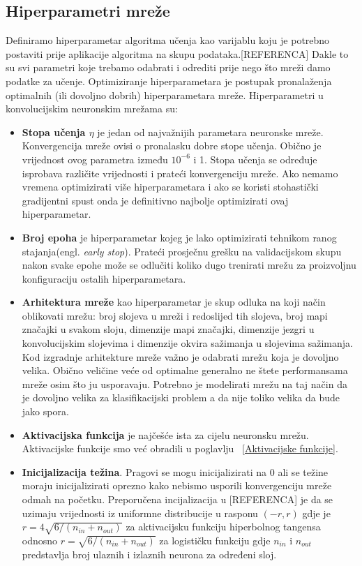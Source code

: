 \documentclass[times, utf8, zavrsni, numeric]{fer}
\begin{document}
\subsection{Hiperparametri mreže}
Definiramo hiperparametar algoritma učenja kao varijablu koju je potrebno postaviti prije aplikacije algoritma na skupu podataka.[REFERENCA] Dakle to su svi parametri koje trebamo odabrati i odrediti prije nego što mreži damo podatke za učenje. Optimiziranje hiperparametara je postupak pronalaženja optimalnih (ili dovoljno dobrih) hiperparametara mreže. Hiperparametri u konvolucijskim neuronskim mrežama su:
\begin{itemize}
\renewcommand\labelitemi{$\bullet$}
\item \textbf{Stopa učenja $\eta$} je jedan od najvažnijih parametara neuronske mreže. Konvergencija mreže ovisi o pronalasku dobre stope učenja. Obično je vrijednost ovog parametra između $10^{-6}$ i 1. Stopa učenja se određuje isprobava različite vrijednosti i prateći konvergenciju mreže. Ako nemamo vremena optimizirati više hiperparametara i ako se koristi stohastički gradijentni spust onda je definitivno najbolje optimizirati ovaj hiperparametar.

\item \textbf{Broj epoha} je hiperparametar kojeg je lako optimizirati tehnikom ranog stajanja(engl. \textit{early stop}). Prateći prosječnu grešku na validacijskom skupu nakon svake epohe može se odlučiti koliko dugo trenirati mrežu za proizvoljnu konfiguraciju ostalih hiperparametara.

\item \textbf{Arhitektura mreže} kao hiperparametar je skup odluka na koji način oblikovati mrežu: broj slojeva u mreži i redoslijed tih slojeva, broj mapi značajki u svakom sloju, dimenzije mapi značajki,
dimenzije jezgri u konvolucijskim slojevima i dimenzije okvira sažimanja u slojevima sažimanja. Kod izgradnje arhitekture mreže važno je odabrati mrežu koja je dovoljno velika. Obično veličine veće od optimalne generalno ne štete performansama mreže osim što ju usporavaju. Potrebno je modelirati mrežu na taj način da je dovoljno velika za klasifikacijski problem a da nije toliko velika da bude jako spora.

\item \textbf{Aktivacijska funkcija} je najčešće ista za cijelu neuronsku mrežu. Aktivacijske funkcije smo već obradili u poglavlju ~\ref{Aktivacijske funkcije}. 

\item \textbf{Inicijalizacija težina}. Pragovi se mogu inicijalizirati na 0 ali se težine moraju inicijalizirati oprezno kako nebismo usporili konvergenciju mreže odmah na početku. Preporučena incijalizacija u [REFERENCA] je da se uzimaju vrijednosti iz uniformne distribucije u rasponu $(-r, r)$ gdje je $r = 4\sqrt{6/(n_{in} + n_{out})}$ za aktivacijsku funkciju hiperbolnog tangensa odnosno $r = \sqrt{6/(n_{in} + n_{out})}$ za logističku funkciju gdje $n_{in}$ i $n_{out}$ predstavlja broj ulaznih i izlaznih neurona za određeni sloj.


\end{itemize}
\end{document}
